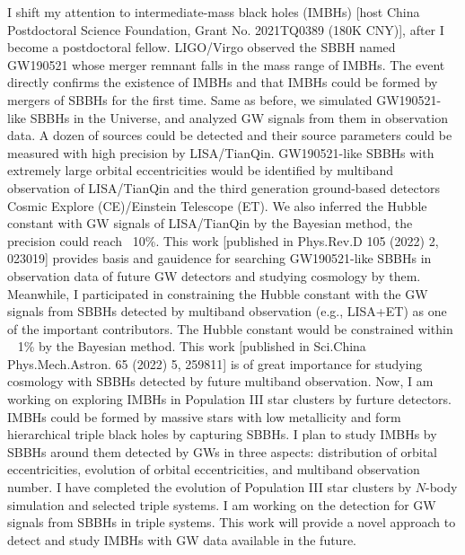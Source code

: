 \documentclass[12pt,a4paper,sans]{article}%
\begin{document}
I shift my attention to intermediate-mass black holes (IMBHs) [host China Postdoctoral Science Foundation, Grant No. 2021TQ0389 (180K CNY)], after I become a postdoctoral fellow. LIGO/Virgo observed the SBBH named
GW190521 whose merger remnant falls in the mass range of IMBHs. The event directly confirms the existence of
IMBHs and that IMBHs could be formed by mergers of SBBHs for the first time. Same as before, we simulated GW190521-like SBBHs in the
Universe, and analyzed GW signals from them in observation data. A dozen of sources could be detected and their source
parameters could be measured with high precision by LISA/TianQin. GW190521-like SBBHs with extremely large orbital
eccentricities would be identified by
multiband observation of LISA/TianQin and the third generation ground-based detectors Cosmic Explore (CE)/Einstein
Telescope (ET). We also inferred the Hubble constant with GW signals of LISA/TianQin by the Bayesian method, the precision could reach
~10\%. This work [published in Phys.Rev.D 105 (2022) 2, 023019] provides
basis and gauidence for searching GW190521-like SBBHs in observation data of future GW detectors and studying
cosmology by them. Meanwhile, I participated in constraining the Hubble
constant with the GW signals from SBBHs detected by multiband observation (e.g., LISA+ET) as one of the important
contributors. The Hubble constant would be constrained within ~ 1\% by the Bayesian method. This work [published in Sci.China Phys.Mech.Astron. 65 (2022) 5, 259811] is of great
importance for studying cosmology with SBBHs detected by future multiband observation. Now, I am working on
exploring IMBHs in Population III star clusters by furture detectors. IMBHs could be
formed by massive stars with low metallicity and form hierarchical triple black holes by capturing SBBHs. I plan to
study IMBHs by SBBHs around them detected by GWs in three aspects: distribution of orbital
eccentricities, evolution of orbital eccentricities, and multiband observation number. I have completed the evolution of
Population III star clusters by $N$-body simulation and selected triple systems. I am working on the detection for 
GW signals from SBBHs in triple systems. This work will provide a novel
approach to detect and study IMBHs with GW data available in the future.
\end{document}
